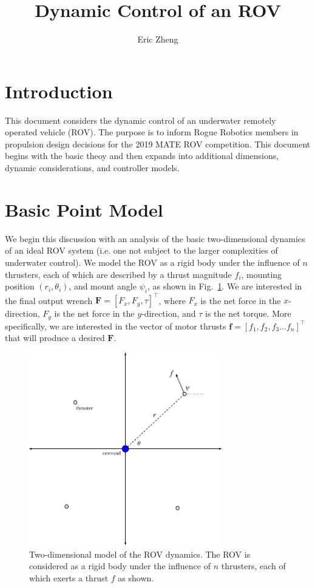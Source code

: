 \documentclass{article}
\title{Dynamic Control of an ROV}
\author{Eric Zheng}
\renewcommand{\vec}[1]{\mathbf{#1}}
\newcommand{\trans}[1]{#1^\intercal}
\begin{document}
\maketitle

\section{Introduction}
This document considers the dynamic control of an underwater remotely operated vehicle (ROV). The purpose is to inform Rogue Robotics members in propulsion design decisions for the 2019 MATE ROV competition. This document begins with the basic theoy and then expands into additional dimensions, dynamic considerations, and controller models.

\section{Basic Point Model}
We begin this discussion with an analysis of the basic two-dimensional dynamics of an ideal ROV system (i.e. one not subject to the larger complexities of underwater control). We model the ROV as a rigid body under the influence of $n$ thrusters, each of which are described by a thrust magnitude $f_i$, mounting position $(r_i, \theta_i)$, and mount angle $\psi_i$, as shown in Fig.~\ref{2d}. We are interested in the final output wrench $\vec{F} = \trans{[F_x, F_y, \tau]}$, where $F_x$ is the net force in the $x$-direction, $F_y$ is the net force in the $y$-direction, and $\tau$ is the net torque. More specifically, we are interested in the vector of motor thrusts $\vec{f} = \trans{[f_1, f_2, f_3 \dots f_n]}$ that will produce a desired $\vec{F}$.

\begin{figure}[ht]
  \centering
  \includegraphics[width=0.75\textwidth]{fig_2d.pdf}
  \caption{Two-dimensional model of the ROV dynamics. The ROV is considered as a rigid body under the influence of $n$ thrusters, each of which exerts a thrust $f$ as shown.}
  \label{2d}
\end{figure}
\end{document}
